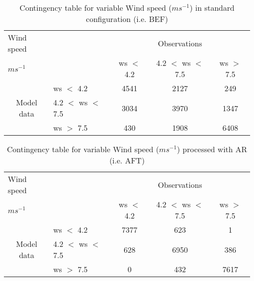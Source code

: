 \documentclass[11pt,english]{article}
\begin{document}
\clearpage
\begin{table}[]
\begin{center}
\begin{tabular}{llccc}
\hline
{Wind speed}                                       &                                                    & \multicolumn{3}{c}{Observations}                 \\
{$m s^{-1}$}                                       &                             & ws $<$ 4.2   & 4.2 $<$ ws $<$ 7.5 & ws $>$ 7.5 \\
\hline
\multicolumn{1}{c}{\multirow{3}{*}{Model data}}  & ws $<$ 4.2             & 4541                & 2127                       & 249              \\
                                                 & 4.2  $<$ ws $<$ 7.5 & 3034                & 3970                       & 1347              \\
                                                 & ws $>$ 7.5             & 430                & 1908                       & 6408              \\
\hline
\end{tabular}
\end{center}
\caption{Contingency table for variable Wind speed ($m s^{-1}$) in standard configuration (i.e. BEF)}
\label{tab:contingencywsBEF}
\end{table}
\begin{table}[]
\begin{center}
\begin{tabular}{llccc}
\hline
{Wind speed}                                       &                                                    & \multicolumn{3}{c}{Observations}                 \\
{$m s^{-1}$}                                       &                             & ws $<$ 4.2   & 4.2 $<$ ws $<$ 7.5 & ws $>$ 7.5 \\
\hline
\multicolumn{1}{c}{\multirow{3}{*}{Model data}}  & ws $<$ 4.2             & 7377                & 623                       & 1              \\
                                                 & 4.2  $<$ ws $<$ 7.5 & 628                & 6950                       & 386              \\
                                                 & ws $>$ 7.5             & 0                & 432                       & 7617              \\
\hline
\end{tabular}
\end{center}
\caption{Contingency table for variable Wind speed ($m s^{-1}$) processed with AR (i.e. AFT)}
\label{tab:contingencywsAFT}
\end{table}
\end{document}
